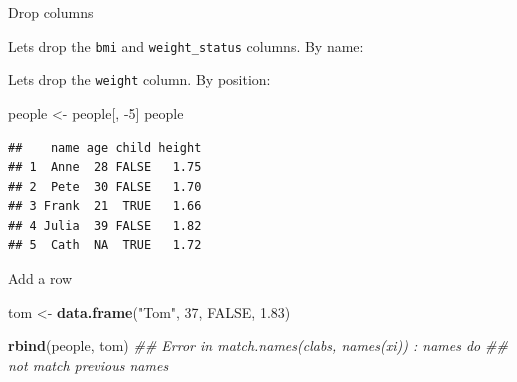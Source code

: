 \documentclass[ignorenonframetext,]{beamer}
\newenvironment{Shaded}{\begin{snugshade}}{\end{snugshade}}
\newcommand{\CommentTok}[1]{\textcolor[rgb]{0.56,0.35,0.01}{\textit{#1}}}
\newcommand{\DecValTok}[1]{\textcolor[rgb]{0.00,0.00,0.81}{#1}}
\newcommand{\FloatTok}[1]{\textcolor[rgb]{0.00,0.00,0.81}{#1}}
\newcommand{\KeywordTok}[1]{\textcolor[rgb]{0.13,0.29,0.53}{\textbf{#1}}}
\newcommand{\NormalTok}[1]{#1}
\newcommand{\OperatorTok}[1]{\textcolor[rgb]{0.81,0.36,0.00}{\textbf{#1}}}
\newcommand{\OtherTok}[1]{\textcolor[rgb]{0.56,0.35,0.01}{#1}}
\newcommand{\StringTok}[1]{\textcolor[rgb]{0.31,0.60,0.02}{#1}}
\begin{document}
\begin{frame}[fragile]{Drop columns}
\protect\hypertarget{drop-columns}{}

Lets drop the \texttt{bmi} and \texttt{weight\_status} columns. By name:

\begin{Shaded}
\end{Shaded}

Lets drop the \texttt{weight} column. By position:

\begin{Shaded}
\begin{Highlighting}[]
\NormalTok{people <-}\StringTok{ }\NormalTok{people[, }\DecValTok{-5}\NormalTok{]}
\NormalTok{people}
\end{Highlighting}
\end{Shaded}

\begin{verbatim}
##    name age child height
## 1  Anne  28 FALSE   1.75
## 2  Pete  30 FALSE   1.70
## 3 Frank  21  TRUE   1.66
## 4 Julia  39 FALSE   1.82
## 5  Cath  NA  TRUE   1.72
\end{verbatim}

\end{frame}

\begin{frame}[fragile]{Add a row}
\protect\hypertarget{add-a-row}{}

\begin{Shaded}
\begin{Highlighting}[]
\NormalTok{tom <-}\StringTok{ }\KeywordTok{data.frame}\NormalTok{(}\StringTok{"Tom"}\NormalTok{, }\DecValTok{37}\NormalTok{, }\OtherTok{FALSE}\NormalTok{, }\FloatTok{1.83}\NormalTok{)}
\end{Highlighting}
\end{Shaded}

\begin{Shaded}
\begin{Highlighting}[]
\KeywordTok{rbind}\NormalTok{(people, tom)}
\CommentTok{## Error in match.names(clabs, names(xi)) : names do}
\CommentTok{## not match previous names}
\end{Highlighting}
\end{Shaded}

\end{frame}
\end{document}
